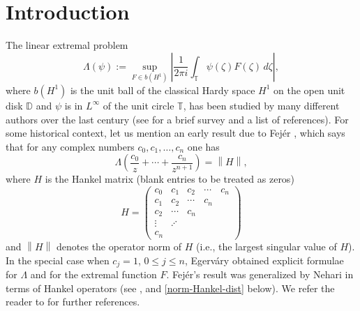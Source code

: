 \documentclass[11pt,reqno]{amsart}
\numberwithin{equation}{section}
\theoremstyle{plain}
\theoremstyle{definition}
\begin{document}
\maketitle

\section{Introduction}

	The linear extremal problem 
	\begin{equation}\label{eq-ExtremalGeneral}
		\Lambda(\psi) := \sup_{F \in b(H^1)} \left|\frac{1}{2 \pi i} \int_{\mathbb{T}} \psi(\zeta) F(\zeta) \,d\zeta \right|,
	\end{equation}
	where $b(H^1)$ is the unit ball of the classical Hardy space $H^1$ \cite{Duren, Ga} on the open unit disk ${ \mathbb{D}}$ and
	$\psi$ is in $L^{\infty}$ of the unit circle ${\mathbb{T}}$, has been studied by many different authors
	over the last century (see \cite{NLEPHS} for a brief survey and a list of references). 
For some historical context, let us mention an early result  due to Fej\'{e}r \cite{Fejer},
	which says that for any complex numbers $c_0, c_1,\ldots, c_n$ one has
	\begin{equation*}
		\Lambda\left(\frac{c_0}{z} + \cdots + \frac{c_{n}}{z^{n + 1}}\right) = {\left\| {H} \right\|},
	\end{equation*}
	where $H$ is the Hankel matrix
	(blank entries to be treated as zeros)
	\begin{equation*}
		H =
		\begin{pmatrix}
			 c_0 & c_1 & c_2 & \cdots & c_n \\
			 c_1 & c_2 & \cdots & c_n &  \\
			 c_2 & \cdots & c_n & &\\
			 \vdots & \iddots & &  &  \\
			 c_n &  &  & &
		\end{pmatrix}
	\end{equation*}
	and ${\left\| {H} \right\|}$ denotes the operator norm of $H$ (i.e., the largest singular value of $H$). In the special case when $c_j = 1$, $0 \leq j \leq n$, Egerv\'{a}ry \cite{Egervary} obtained explicit formulae for $\Lambda$ and for the extremal function $F$.
	Fej\'{e}r's result was generalized by Nehari in terms of Hankel operators (see \cite{Nehari}, \cite[Theorem 1.1.1]{Peller} and \eqref{norm-Hankel-dist} below). 
	We refer the reader to \cite{Duren, Ga, Kha-Sr} for further references.
	
	
	
\end{document}
